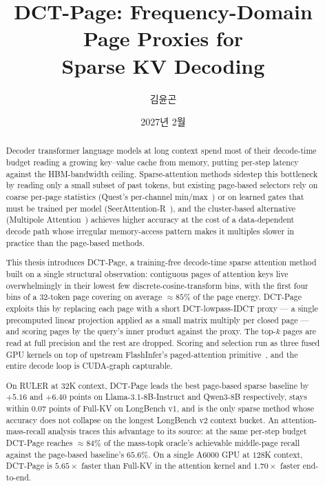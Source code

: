 \documentclass[en]{snu-ece-bsc-thesis}
\title{DCT-Page: Frequency-Domain Page Proxies for\\Sparse KV Decoding}
\author{김윤곤}
\date{2027년 2월}
\begin{document}
\begingroup
\hypersetup{pageanchor=false}
\maketitle
\endgroup


\begin{abstract}
Decoder transformer language models at long context spend most of
their decode-time budget reading a growing key--value cache from
memory, putting per-step latency against the HBM-bandwidth ceiling.
Sparse-attention methods sidestep this bottleneck by reading only a
small subset of past tokens, but existing page-based selectors rely
on coarse per-page statistics (Quest's per-channel
min/max~\cite{tang2024quest}) or on learned gates that must be trained
per model (SeerAttention-R~\cite{gao2025seerattention}), and the
cluster-based alternative (Multipole
Attention~\cite{hooper2025multipole}) achieves higher accuracy at the
cost of a data-dependent decode path whose irregular memory-access
pattern makes it multiples slower in practice than the page-based
methods.

This thesis introduces DCT-Page, a training-free decode-time sparse
attention method built on a single structural observation:
contiguous pages of attention keys live overwhelmingly in their
lowest few discrete-cosine-transform bins, with the first four bins
of a $32$-token page covering on average $\approx 85\%$ of the page
energy.  DCT-Page exploits this by replacing each page with a short
DCT-lowpass-IDCT proxy --- a single precomputed linear projection
applied as a small matrix multiply per closed page --- and scoring
pages by the query's inner product against the proxy.  The top-$k$
pages are read at full precision and the rest are dropped.  Scoring
and selection run as three fused GPU kernels on top of upstream
FlashInfer's paged-attention primitive~\cite{ye2025flashinfer}, and
the entire decode loop is CUDA-graph capturable.

On RULER at $32$K context, DCT-Page leads the best page-based sparse
baseline by $+5.16$ and $+6.40$ points on Llama-3.1-8B-Instruct and
Qwen3-8B respectively, stays within $0.07$ points of Full-KV on
LongBench v1, and is the only sparse method whose accuracy does not
collapse on the longest LongBench v2 context bucket.  An
attention-mass-recall analysis traces this advantage to its source:
at the same per-step budget DCT-Page reaches $\approx 84\%$ of the
mass-topk oracle's achievable middle-page recall against the
page-based baseline's $65.6\%$.  On a
single A6000 GPU at $128$K context, DCT-Page is $5.65 \times$ faster
than Full-KV in the attention kernel and $1.70 \times$ faster
end-to-end.
\end{abstract}
\end{document}
